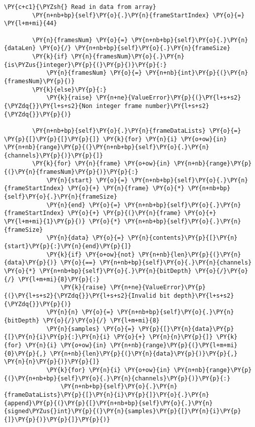 \begin{Verbatim}[commandchars=\\\{\}]
        \PY{c+c1}{\PYZsh{} Read in data from array}
        \PY{n+nb+bp}{self}\PY{o}{.}\PY{n}{frameStartIndex} \PY{o}{=} \PY{l+m+mi}{44}

        \PY{n}{framesNum} \PY{o}{=} \PY{n+nb+bp}{self}\PY{o}{.}\PY{n}{dataLen} \PY{o}{/} \PY{n+nb+bp}{self}\PY{o}{.}\PY{n}{frameSize}
        \PY{k}{if} \PY{n}{framesNum}\PY{o}{.}\PY{n}{is\PYZus{}integer}\PY{p}{(}\PY{p}{)}\PY{p}{:}
            \PY{n}{framesNum} \PY{o}{=} \PY{n+nb}{int}\PY{p}{(}\PY{n}{framesNum}\PY{p}{)}
        \PY{k}{else}\PY{p}{:}
            \PY{k}{raise} \PY{n+ne}{ValueError}\PY{p}{(}\PY{l+s+s2}{\PYZdq{}}\PY{l+s+s2}{Non integer frame number}\PY{l+s+s2}{\PYZdq{}}\PY{p}{)}

        \PY{n+nb+bp}{self}\PY{o}{.}\PY{n}{frameDataLists} \PY{o}{=} \PY{p}{[}\PY{p}{[}\PY{p}{]} \PY{k}{for} \PY{n}{i} \PY{o+ow}{in} \PY{n+nb}{range}\PY{p}{(}\PY{n+nb+bp}{self}\PY{o}{.}\PY{n}{channels}\PY{p}{)}\PY{p}{]}
        \PY{k}{for} \PY{n}{frame} \PY{o+ow}{in} \PY{n+nb}{range}\PY{p}{(}\PY{n}{framesNum}\PY{p}{)}\PY{p}{:}
            \PY{n}{start} \PY{o}{=} \PY{n+nb+bp}{self}\PY{o}{.}\PY{n}{frameStartIndex} \PY{o}{+} \PY{n}{frame} \PY{o}{*} \PY{n+nb+bp}{self}\PY{o}{.}\PY{n}{frameSize}
            \PY{n}{end} \PY{o}{=} \PY{n+nb+bp}{self}\PY{o}{.}\PY{n}{frameStartIndex} \PY{o}{+} \PY{p}{(}\PY{n}{frame} \PY{o}{+} \PY{l+m+mi}{1}\PY{p}{)} \PY{o}{*} \PY{n+nb+bp}{self}\PY{o}{.}\PY{n}{frameSize}
            \PY{n}{data} \PY{o}{=} \PY{n}{contents}\PY{p}{[}\PY{n}{start}\PY{p}{:}\PY{n}{end}\PY{p}{]}
            \PY{k}{if} \PY{o+ow}{not} \PY{n+nb}{len}\PY{p}{(}\PY{n}{data}\PY{p}{)} \PY{o}{==} \PY{n+nb+bp}{self}\PY{o}{.}\PY{n}{channels} \PY{o}{*} \PY{n+nb+bp}{self}\PY{o}{.}\PY{n}{bitDepth} \PY{o}{/}\PY{o}{/} \PY{l+m+mi}{8}\PY{p}{:}
                \PY{k}{raise} \PY{n+ne}{ValueError}\PY{p}{(}\PY{l+s+s2}{\PYZdq{}}\PY{l+s+s2}{Invalid bit depth}\PY{l+s+s2}{\PYZdq{}}\PY{p}{)}
            \PY{n}{n} \PY{o}{=} \PY{n+nb+bp}{self}\PY{o}{.}\PY{n}{bitDepth} \PY{o}{/}\PY{o}{/} \PY{l+m+mi}{8}
            \PY{n}{samples} \PY{o}{=} \PY{p}{[}\PY{n}{data}\PY{p}{[}\PY{n}{i}\PY{p}{:}\PY{n}{i} \PY{o}{+} \PY{n}{n}\PY{p}{]} \PY{k}{for} \PY{n}{i} \PY{o+ow}{in} \PY{n+nb}{range}\PY{p}{(}\PY{l+m+mi}{0}\PY{p}{,} \PY{n+nb}{len}\PY{p}{(}\PY{n}{data}\PY{p}{)}\PY{p}{,} \PY{n}{n}\PY{p}{)}\PY{p}{]}
            \PY{k}{for} \PY{n}{i} \PY{o+ow}{in} \PY{n+nb}{range}\PY{p}{(}\PY{n+nb+bp}{self}\PY{o}{.}\PY{n}{channels}\PY{p}{)}\PY{p}{:}
                \PY{n+nb+bp}{self}\PY{o}{.}\PY{n}{frameDataLists}\PY{p}{[}\PY{n}{i}\PY{p}{]}\PY{o}{.}\PY{n}{append}\PY{p}{(}\PY{p}{[}\PY{n+nb+bp}{self}\PY{o}{.}\PY{n}{signed\PYZus{}int}\PY{p}{(}\PY{n}{samples}\PY{p}{[}\PY{n}{i}\PY{p}{]}\PY{p}{)}\PY{p}{]}\PY{p}{)}


\end{Verbatim}
